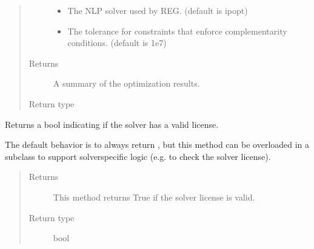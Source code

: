 \documentclass[letterpaper,10pt,english]{sphinxmanual}
\begin{document}
\begin{fulllineitems}
\begin{fulllineitems}
\begin{quote}
\begin{description}
\begin{itemize}
\item {} 
 \textendash{} The NLP solver used by REG.  (default is ipopt)

\item {} 
 \textendash{} The tolerance for constraints that enforce complementarity conditions.  (default is 1e\sphinxhyphen{}7)

\end{itemize}

\item[{Returns}] \leavevmode
A summary of the optimization results.

\item[{Return type}] \leavevmode
{\hyperref[\detokenize{reference/solverapi:pao.common.solver.Results}]{}}

\end{description}\end{quote}

\end{fulllineitems}


\begin{fulllineitems}
\label{\detokenize{reference/mpr:pao.mpr.solvers.reg.LinearMultilevelSolver_REG.valid_license}}
Returns a bool indicating if the solver has a valid license.

The default behavior is to always return , but this method
can be overloaded in a subclass to support solver\sphinxhyphen{}specific logic
(e.g.  to check the solver license).
\begin{quote}\begin{description}
\item[{Returns}] \leavevmode
This method returns True if the solver license is valid.

\item[{Return type}] \leavevmode
bool

\end{description}\end{quote}

\end{fulllineitems}



\end{fulllineitems}
\end{document}
